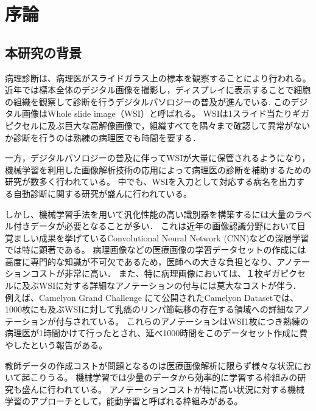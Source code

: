 \chapter{序論}

\section{本研究の背景}

病理診断は、病理医がスライドガラス上の標本を観察することにより行われる。
近年では標本全体のデジタル画像を撮影し，ディスプレイに表示することで細胞の組織を観察して診断を行うデジタルパソロジーの普及が進んでいる\cite{pantanowitz2010digital}.
このデジタル画像はWhole slide image（WSI）と呼ばれる。
WSIは1スライド当たりギガピクセルに及ぶ巨大な高解像画像で，組織すべてを隅々まで確認して異常がないか診断を行うのは熟練の病理医でも時間を要する．

一方，デジタルパソロジーの普及に伴ってWSIが大量に保管されるようになり，機械学習を利用した画像解析技術の応用によって病理医の診断を補助するための研究が数多く行われている\cite{gurcan2009histopathological, komuraishikawa, litjens2017survey}。
中でも、WSIを入力として対応する病名を出力する自動診断に関する研究が盛んに行われている\cite{doyle2008automated,dundar2011computerized}。

しかし、機械学習手法を用いて汎化性能の高い識別器を構築するには大量のラベル付きデータが必要となることが多い．
これは近年の画像認識分野において目覚ましい成果を挙げているConvolutional Neural Network (CNN)などの深層学習では特に顕著である。
病理画像などの医療画像の学習データセットの作成には高度に専門的な知識が不可欠であるため，医師への大きな負担となり、アノテーションコストが非常に高い．
また、特に病理画像においては、１枚ギガピクセルに及ぶWSIに対する詳細なアノテーションの付与には莫大なコストが伴う．
例えば、Camelyon Grand Challenge \cite{Camelyon17}にて公開されたCamelyon Datasetでは、1000枚にも及ぶWSIに対して乳癌のリンパ節転移の存在する領域への詳細なアノテーションが付与されている。
これらのアノテーションはWSI1枚につき熟練の病理医が1時間かけて行ったとされ、延べ1000時間をこのデータセット作成に費やしたという報告がある。

教師データの作成コストが問題となるのは医療画像解析に限らず様々な状況において起こりうる。
機械学習では少量のデータから効率的に学習する枠組みの研究も盛んに行われている。
アノテーションコストが特に高い状況に対する機械学習のアプローチとして，能動学習\cite{settles2010active}と呼ばれる枠組みがある。

